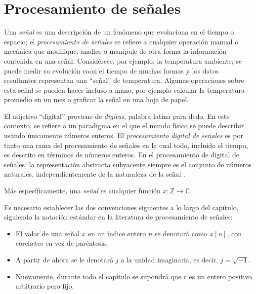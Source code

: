 \newpage
\section{Procesamiento de señales}

Una \emph{señal} es una descripción de un fenómeno que evoluciona en el tiempo o espacio; el \emph{procesamiento de señales} se refiere a cualquier operación manual o mecánica que modifique, analice o manipule de otra forma la información contenida en una señal. Considérese, por ejemplo, la temperatura ambiente; se puede medir su evolución coon el tiempo de muchas formas y los datos resultantes representan una ``señal'' de temperatura. Algunas operaciones sobre esta señal se pueden hacer incluso a mano, por ejemplo calcular la temperatura promedio en un mes o graficar la señal en una hoja de papel.

\bigskip

El adjetivo ``digital'' proviene de \emph{digitus}, palabra latina para dedo. En este contexto, se refiere a un paradigma en el que el mundo físico se puede describir usando únicamente números enteros.
El \emph{procesamiento digital de señales} es por tanto una rama del procesamiento de señales en la cual todo, incluido el tiempo, es descrito en términos de números enteros. En el procesamiento de digital de señales, la representación abstracta subyacente siempre es el conjunto de números naturales, independientemente de la naturaleza de la señal \cite{Prand1}.

\begin{definition}
Más específicamente, una \emph{señal} es cualquier función $x : \mathbb{Z} \longrightarrow \mathbb{C}$.
\end{definition}

\begin{remark}
Es necesario establecer las dos convenciones siguientes a lo largo del capítulo, siguiendo la notación estándar en la literatura de procesamiento de señales:
\begin{itemize}
\item El valor de una señal $x$ en un índice entero $n$ se denotará como $x[n]$, con corchetes en vez de paréntesis.
\item A partir de ahora se le denotará $j$ a la unidad imaginaria, es decir, $j = \sqrt{-1}$.
\item Nuevamente, durante todo el capítulo se supondrá que $r$ es un entero positivo arbitrario pero fijo.
\end{itemize}
\end{remark}

